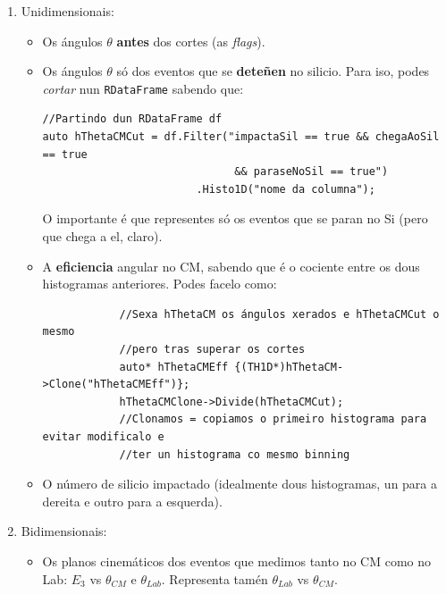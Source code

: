 \documentclass[11pt, a4paper]{article}
\begin{document}
\begin{enumerate}
    \item Unidimensionais:
          \begin{itemize}
              \item Os ángulos $\theta$ \textbf{antes} dos cortes (as \textit{flags}).
              \item Os ángulos $\theta$ só dos eventos que se \textbf{deteñen} no silicio. Para iso, podes \textit{cortar} nun \lstinline{RDataFrame} sabendo que:
                    \begin{lstlisting}
//Partindo dun RDataFrame df
auto hThetaCMCut = df.Filter("impactaSil == true && chegaAoSil == true 
                              && paraseNoSil == true")
                        .Histo1D("nome da columna");
        \end{lstlisting}
                    O importante é que representes só os eventos que se paran no Si (pero que chega a el, claro).
              \item A \textbf{eficiencia} angular no CM, sabendo que é o cociente entre os dous histogramas anteriores. Podes facelo como:
                    \begin{lstlisting}
            //Sexa hThetaCM os ángulos xerados e hThetaCMCut o mesmo 
            //pero tras superar os cortes
            auto* hThetaCMEff {(TH1D*)hThetaCM->Clone("hThetaCMEff")};
            hThetaCMClone->Divide(hThetaCMCut);
            //Clonamos = copiamos o primeiro histograma para evitar modificalo e 
            //ter un histograma co mesmo binning
        \end{lstlisting}

              \item O número de silicio impactado (idealmente dous histogramas, un para a dereita e outro para a esquerda).
          \end{itemize}
    \item Bidimensionais:
          \begin{itemize}
              \item Os planos cinemáticos dos eventos que medimos tanto no CM como no Lab: $E_3$ vs $\theta_{CM}$ e $\theta_{Lab}$. Representa tamén $\theta_{Lab}$ vs $\theta_{CM}$.
          \end{itemize}

\end{enumerate}

\end{document}
